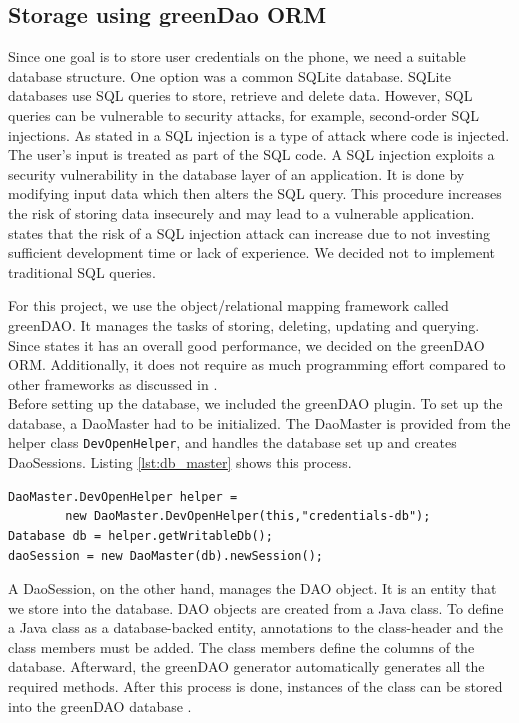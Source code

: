 

\subsection{Storage using greenDao ORM}
Since one goal is to store user credentials on the phone, we need a suitable database structure. One option was a common SQLite database. SQLite databases use SQL queries to store, retrieve and delete data. However, SQL queries can be vulnerable to security attacks, for example, second-order SQL injections. As stated in \cite{Halfond2005} a SQL injection is a type of attack where code is injected. The user's input is treated as part of the SQL code. A SQL injection exploits a security vulnerability in the database layer of an application. It is done by modifying input data which then alters the SQL query. This procedure increases the risk of storing data insecurely and may lead to a vulnerable application. \cite{katole2018detection} states that the risk of a SQL injection attack can increase due to not investing sufficient development time or lack of experience. We decided not to implement traditional SQL queries.

For this project, we use the object/relational mapping framework called greenDAO. It manages the tasks of storing, deleting, updating and querying. Since \cite{Greendao} states it has an overall good performance, we decided on the greenDAO ORM. Additionally, it does not require as much programming effort compared to other frameworks as discussed in \cite{pu2016understanding}. \\
Before setting up the database, we included the greenDAO plugin. To set up the database, a DaoMaster had to be initialized. The DaoMaster is provided from the helper class \texttt{DevOpenHelper}, and handles the database set up and creates DaoSessions. Listing \ref{lst:db_master} shows this process.

\begin{lstlisting}[float,floatplacement=h, caption=Creation of Database, label=lst:db_master]
DaoMaster.DevOpenHelper helper = 
        new DaoMaster.DevOpenHelper(this,"credentials-db");
Database db = helper.getWritableDb();
daoSession = new DaoMaster(db).newSession();
\end{lstlisting}

A DaoSession, on the other hand, manages the DAO object. It is an entity that we store into the database. DAO objects are created from a Java class. To define a Java class as a database-backed entity, annotations to the class-header and the class members must be added. The class members define the columns of the database. Afterward, the greenDAO generator automatically generates all the required methods. After this process is done, instances of the class can be stored into the greenDAO database \cite{Greendao}.


